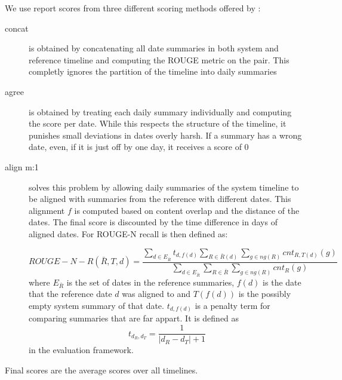 \documentclass[a4paper,BCOR=10mm]{report}
\numberwithin{lemma}{chapter}
\numberwithin{definition}{chapter}
\begin{document}
We use report scores from three different scoring methods offered by \citet{tilse}:
\begin{description}
\item[concat] {is obtained by concatenating all date summaries in both system and reference timeline and computing the ROUGE metric on the pair.
This completly ignores the partition of the timeline into daily summaries}
\item[agree] {is obtained by treating each daily summary individually and computing the score per date. While this respects the structure of the timeline, it punishes small deviations in dates overly harsh. If a summary has a wrong date, even, if it is just off by one day, it receives a score of $0$}
\item[align m:1] {solves this problem by allowing daily summaries of the system timeline to be aligned with summaries from the reference with different dates. This alignment $f$ is computed based on content overlap and the distance of the dates.
The final score is discounted by the time difference in days of aligned dates. For ROUGE-N recall is then defined as:

\begin{equation}
    \mathit{ROUGE-N-R}(\bar{R}, T, d) =  \frac{
        \sum_{d \in E_{\bar{R}}} t_{d, f(d)}
        \sum_{R \in \bar{R}(d)}
        \sum_{g \in \mathit{ng}(R)}
        \mathit{cnt}_{R,T(d)}(g)
    }{
        \sum_{d \in E_{\bar{R}}}
        \sum_{R \in \bar{R}}
        \sum_{g \in \mathit{ng}(R)}
        \mathit{cnt}_R(g)
    }
\end{equation}
where $E_{\bar{R}}$ is the set of dates in the reference summaries,
$f(d)$ is the date that the reference date $d$ was aligned to and $T(f(d))$ is the possibly empty system summary of that date.
$t_{d,f(d)}$ is a penalty term for comparing summaries that are far appart.
It is defined as
\begin{equation}
t_{d_R, d_T} = \frac{1}{|d_R - d_T| + 1}
\end{equation}
in the evaluation framework.


 }
\end{description}


Final scores are the average scores over all timelines.
\end{document}
